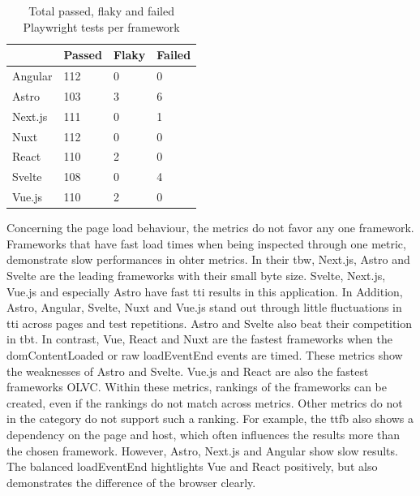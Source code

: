 \documentclass[a4paper, 12pt]{article}
\begin{document}
\begin{table}[!ht]
  \centering
  \begin{tabular}{|l|l|l|l|}
    \hline
    ~         & \textbf{Passed} & \textbf{Flaky}  & \textbf{Failed} \\ \hline
    Angular   & 112             & 0               & 0               \\ \hline
    Astro     & 103             & 3               & 6               \\ \hline
    Next.js   & 111             & 0               & 1               \\ \hline
    Nuxt      & 112             & 0               & 0               \\ \hline
    React     & 110             & 2               & 0               \\ \hline
    Svelte    & 108             & 0               & 4               \\ \hline
    Vue.js    & 110             & 2               & 0               \\ \hline
  \end{tabular}
  \caption{Total passed, flaky and failed Playwright tests per framework}
  \label{tab:playwright:total}
\end{table}

Concerning the page load behaviour, the metrics do not favor any one framework.
Frameworks that have fast load times when being inspected through one metric, demonstrate slow performances in ohter metrics.
In their \acrlong{tbw}, Next.js, Astro and Svelte are the leading frameworks with their small byte size.
Svelte, Next.js, Vue.js and especially Astro have fast \acrlong{tti} results in this application.
In Addition, Astro, Angular, Svelte, Nuxt and Vue.js stand out through little fluctuations in \acrshort{tti} across pages and test repetitions.
Astro and Svelte also beat their competition in \acrlong{tbt}.
In contrast, Vue, React and Nuxt are the fastest frameworks when the domContentLoaded or raw loadEventEnd events are timed.
These metrics show the weaknesses of Astro and Svelte.
Vue.js and React are also the fastest frameworks OLVC.
Within these metrics, rankings of the frameworks can be created, even if the rankings do not match across metrics.
Other metrics do not in the category do not support such a ranking.
For example, the \acrlong{ttfb} also shows a dependency on the page and host, which often influences the results more than the chosen framework.
However, Astro, Next.js and Angular show slow results.
The balanced loadEventEnd hightlights Vue and React positively, but also demonstrates the difference of the browser clearly.
\end{document}
